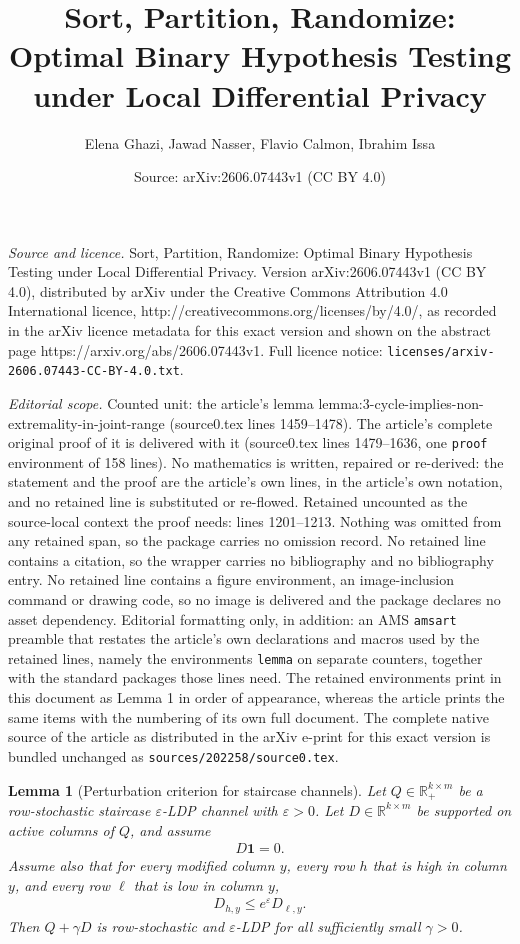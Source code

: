 \documentclass[10pt,a4paper]{amsart}
\title{Sort, Partition, Randomize: Optimal Binary Hypothesis Testing under Local Differential Privacy}
\author{Elena Ghazi, Jawad Nasser, Flavio Calmon, Ibrahim Issa}
\date{Source: arXiv:2606.07443v1 (CC BY 4.0)}
\newtheorem{lemma}{Lemma}
\begin{document}
\maketitle

\noindent\emph{Source and licence.} Sort, Partition, Randomize: Optimal Binary Hypothesis Testing under Local Differential Privacy. Version arXiv:2606.07443v1 (CC BY 4.0), distributed by arXiv under the Creative Commons Attribution 4.0 International licence, http://creativecommons.org/licenses/by/4.0/, as recorded in the arXiv licence metadata for this exact version and shown on the abstract page https://arxiv.org/abs/2606.07443v1. Full licence notice: \texttt{licenses/arxiv-2606.07443-CC-BY-4.0.txt}.\par\smallskip

\noindent\textit{Editorial scope.} Counted unit: the article's lemma lemma:3-cycle-implies-non-extremality-in-joint-range (source0.tex lines 1459--1478). The article's complete original proof of it is delivered with it (source0.tex lines 1479--1636, one \texttt{proof} environment of 158 lines). No mathematics is written, repaired or re-derived: the statement and the proof are the article's own lines, in the article's own notation, and no retained line is substituted or re-flowed.  Retained uncounted as the source-local context the proof needs: lines 1201--1213.  Nothing was omitted from any retained span, so the package carries no omission record.  No retained line contains a citation, so the wrapper carries no bibliography and no bibliography entry.  No retained line contains a figure environment, an image-inclusion command or drawing code, so no image is delivered and the package declares no asset dependency.  Editorial formatting only, in addition: an AMS \texttt{amsart} preamble that restates the article's own declarations and macros used by the retained lines, namely the environments \texttt{lemma} on separate counters, together with the standard packages those lines need.  The retained environments print in this document as Lemma 1 in order of appearance, whereas the article prints the same items with the numbering of its own full document.  The complete native source of the article as distributed in the arXiv e-print for this exact version is bundled unchanged as \texttt{sources/202258/source0.tex}.
\begin{lemma}[Perturbation criterion for staircase channels]
\label{lemma:perturbation-criterion-staircase}
Let $Q\in\mathbb{R}_+^{k\times m}$ be a row-stochastic staircase $\varepsilon$-LDP channel with $\varepsilon>0$. Let $D\in\mathbb{R}^{k\times m}$ be supported on active columns of $Q$, and assume
\begin{align*}
    D\mathbf{1}=0.
\end{align*}
Assume also that for every modified column $y$, every row $h$ that is high in column $y$, and every row $\ell$ that is low in column $y$,
\begin{align}
    \label{eq:perturbation-high-low-inequality}
    D_{h,y}\le e^\varepsilon D_{\ell,y}.
\end{align}
Then $Q+\gamma D$ is row-stochastic and $\varepsilon$-LDP for all sufficiently small $\gamma>0$.
\end{lemma}
\end{document}
